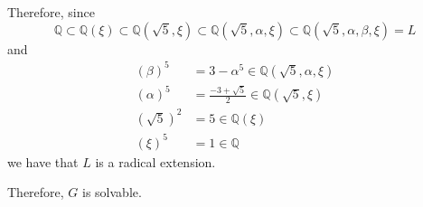 \documentclass[12pt]{Qual}
\begin{document}
\begin{solution}
\begin{enumerate}[label=(\alph*)]
    Therefore, since $$\mathbb{Q}\subset\mathbb{Q}(\xi)\subset\mathbb{Q}(\sqrt{5},\xi)\subset \mathbb{Q}(\sqrt{5},\alpha,\xi)\subset\mathbb{Q}(\sqrt{5},\alpha,\beta,\xi)=L$$ and \begin{align*}
        (\beta)^5&=3-\alpha^5\in\mathbb{Q}(\sqrt{5},\alpha,\xi)\\
        (\alpha)^5&=\frac{-3+\sqrt{5}}{2}\in\mathbb{Q}(\sqrt{5},\xi)\\
        (\sqrt{5})^2&=5\in\mathbb{Q}(\xi)\\
        (\xi)^5&=1\in\mathbb{Q}
    \end{align*} we have that $L$ is a radical extension.

    Therefore, $G$ is solvable.
\end{enumerate}
\end{solution}
\newpage
\end{document}
